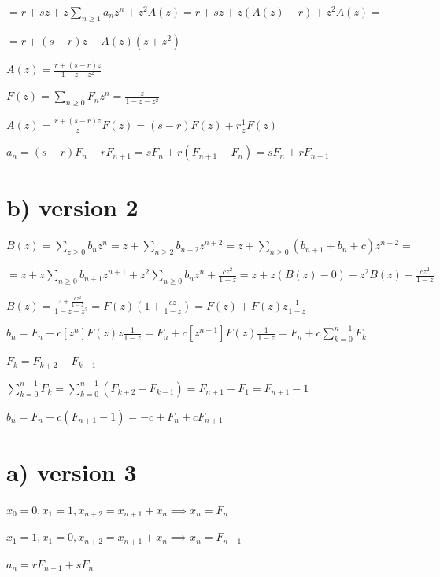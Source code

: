 \documentclass{article}
\begin{document}
$= r + sz + z \sum_{n \geq 1}a_n z^n + z^2 A(z) = r + sz + z (A(z)-r) + z^2 A(z) =$

$= r + (s-r)z + A(z)(z+z^2)$

$A(z) = \frac{r + (s-r)z}{1-z-z^2}$

$F(z) = \sum_{n \geq 0} F_nz^n = \frac{z}{1-z-z^2}$

$A(z) = \frac{r+(s-r)z}{z}F(z) = (s-r)F(z) + r \frac{1}{z}F(z)$

$a_n = (s-r)F_{n} + r F_{n+1} = s F_n + r(F_{n+1} - F_{n}) = s F_n + r F_{n-1}$

\section*{b) version 2}

$B(z) = \sum_{z \geq 0} b_nz^n = z + \sum_{n \geq 2} b_{n+2}z^{n+2} = z + \sum_{n \geq 0} (b_{n+1} + b_n + c)z^{n+2} =$

$= z + z\sum_{n \geq 0} b_{n+1}z^{n+1} + z^2 \sum_{n\geq 0}b_nz^n + \frac{cz^2}{1-z} = z + z(B(z) - 0) + z^2 B(z) + \frac{cz^2}{1-z}$

$B(z) = \frac{z + \frac{cz^2}{1-z}}{1-z-z^2} = F(z)(1 + \frac{cz}{1-z}) = F(z) + F(z) z\frac{1}{1-z}$

$b_n = F_n + c[z^n]F(z)z\frac{1}{1-z} = F_n + c[z^{n-1}]F(z)\frac{1}{1-z} = F_n + c\sum_{k=0}^{n-1}F_k$

$F_k = F_{k+2} - F_{k+1}$

$\sum_{k=0}^{n-1}F_k = \sum_{k=0}^{n-1}(F_{k+2} - F_{k+1}) = F_{n+1} - F_1 = F_{n+1} - 1$

$b_n = F_n + c(F_{n+1} - 1) = -c + F_n + cF_{n+1}$

\section*{a) version 3}

$x_0 = 0, x_1 = 1, x_{n+2} = x_{n+1} + x_n \implies x_n = F_n$

$x_1 = 1, x_1 = 0, x_{n+2} = x_{n+1} + x_n \implies x_n = F_{n-1}$

$a_n = rF_{n-1} + sF_{n}$
\end{document}
